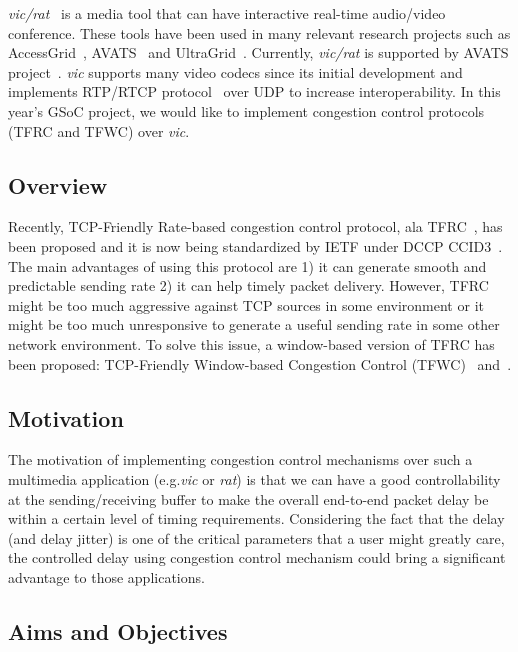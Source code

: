 
\emph{vic/rat}~\cite{MEDIATOOLS} is a media tool that can have interactive
real-time audio/video conference. These tools have been used in many relevant
research projects such as AccessGrid~\cite{ACCESSGRID}, AVATS~\cite{AVATS} and
UltraGrid~\cite{UltraGrid}. Currently, \emph{vic/rat} is supported by AVATS
project~\cite{AVATS}. \emph{vic} supports many video codecs since its initial
development and implements RTP/RTCP protocol~\cite{RTP} over UDP to increase
interoperability. In this year's GSoC project, we would like to implement
congestion control protocols (TFRC and TFWC) over \emph{vic}. 

\subsection{\label{ssec:project_overview}Overview}

Recently, TCP-Friendly Rate-based congestion control protocol, ala
TFRC~\cite{FHPW00}, has been proposed and it is now being standardized by IETF
under DCCP CCID3~\cite{CCID3}. The main advantages of using this protocol are 1)
it can generate smooth and predictable sending rate 2) it can help timely packet
delivery. However, TFRC might be too much aggressive against TCP sources in some
environment or it might be too much unresponsive to generate a useful sending
rate in some other network environment. To solve this issue, a window-based
version of TFRC has been proposed: TCP-Friendly Window-based Congestion Control
(TFWC)~\cite{SH06} and~\cite{CH07}.

\subsection{\label{ssec:motivation}Motivation}

The motivation of implementing congestion control mechanisms over such a
multimedia application (e.g.\emph{vic} or \emph{rat}) is that we can have a good
controllability at the sending/receiving buffer to make the overall end-to-end
packet delay be within a certain level of timing requirements. Considering the
fact that the delay (and delay jitter) is one of the critical parameters that a
user might greatly care, the controlled delay using congestion control mechanism
could bring a significant advantage to those applications.

\subsection{\label{ssec:aims}Aims and Objectives}

